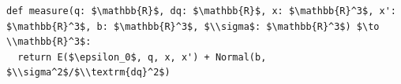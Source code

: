 \documentclass[border=10pt]{standalone}
\begin{document}
\begin{lstlisting}
def measure(q: $\mathbb{R}$, dq: $\mathbb{R}$, x: $\mathbb{R}^3$, x': $\mathbb{R}^3$, b: $\mathbb{R}^3$, $\\sigma$: $\mathbb{R}^3$) $\to \\mathbb{R}^3$:
  return E($\epsilon_0$, q, x, x') + Normal(b, $\\sigma^2$/$\\textrm{dq}^2$)
\end{lstlisting}
\end{document}
